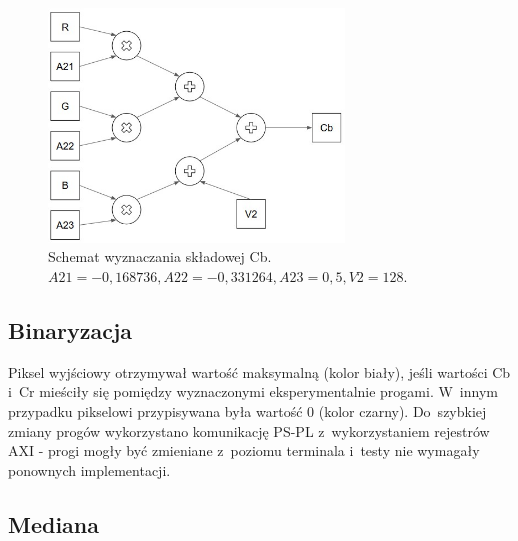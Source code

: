 \begin{figure}[h]
	\centering
	\includegraphics[width=0.7\textwidth]{drzewo_ycbcr.jpg}
	\caption{Schemat wyznaczania składowej Cb. $A21=-0,168736, A22=-0,331264, A23=0,5, V2=128$.}
	\label{fig:drzewo_ycbcr}
\end{figure} 

\subsection{Binaryzacja}
\label{subsec:Binaryzacja}
Piksel wyjściowy otrzymywał wartość maksymalną (kolor biały), jeśli wartości Cb i~Cr mieściły się pomiędzy wyznaczonymi eksperymentalnie progami.  
W~innym przypadku pikselowi przypisywana była wartość 0 (kolor czarny). 
Do~szybkiej zmiany progów wykorzystano komunikację PS-PL z~wykorzystaniem rejestrów AXI - progi mogły być zmieniane z~poziomu terminala i~testy nie wymagały ponownych implementacji.  



\subsection{Mediana}
\label{subsec:Mediana}

